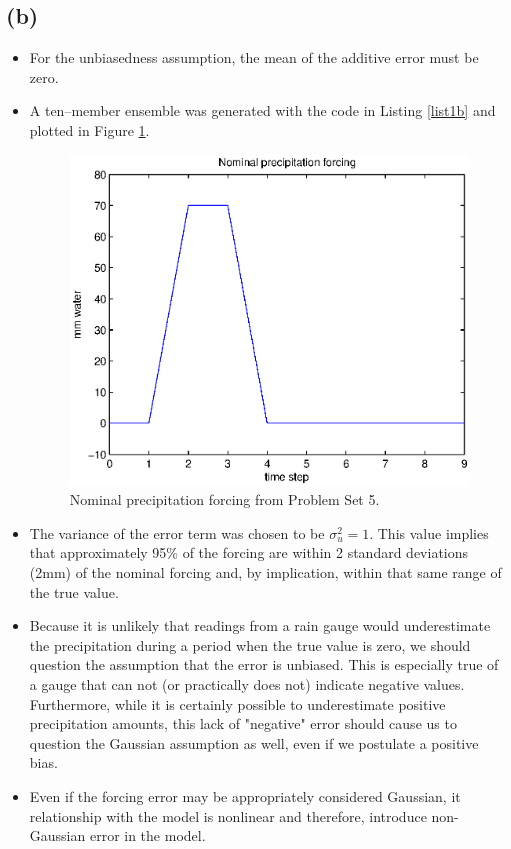 \documentclass[letterpaper]{tufte-handout}
\begin{document}
\subsection{(b)}
\begin{itemize}
  \item For the unbiasedness assumption, the mean of the additive error must be zero.
  \item A ten--member ensemble was generated with the code in Listing \ref{list1b} and plotted in Figure \ref{1b}.
    {\small
    
  }
    \begin{figure}
      \includegraphics[width=\textwidth]{1a}
      \caption{Nominal precipitation forcing from Problem Set 5.}
      \label{1b}
    \end{figure}
  \item The variance of the error term was chosen to be $\sigma^2_u = 1$. This value implies that approximately 95\% of the forcing are within 2 standard deviations (2mm) of the nominal forcing and, by implication, within that same range of the true value. 
  \item Because it is unlikely that readings from a rain gauge would underestimate the precipitation during a period when the true value is zero, we should question the assumption that the error is unbiased.
    This is especially true of a gauge that can not (or practically does not) indicate negative values. Furthermore, while it is certainly possible to underestimate positive precipitation amounts, this lack of "negative" error should cause us to question the Gaussian assumption as well, even if we postulate a positive bias.
  \item Even if the forcing error may be appropriately considered Gaussian, it relationship with the model is nonlinear and therefore, introduce non-Gaussian error in the model.
\end{itemize}
\end{document}
